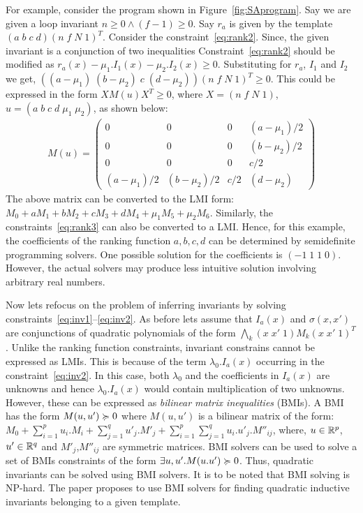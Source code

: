 For example, consider the program shown in Figure~\ref{fig:SAprogram}.
Say we are given a loop invariant $n \ge 0 \wedge (f-1) \ge 0$.
Say $r_a$ is given by the template $(a \; b \; c \; d)(n \; f \; N \; 1)^T$. 
Consider the constraint~\ref{eq:rank2}. Since, the given invariant 
is a conjunction of two inequalities Constraint~\ref{eq:rank2} should be modified as $r_a(x) - \mu_1.I_1(x)- \mu_2.I_2(x) \ge 0$. 
Substituting for $r_a$, $I_1$ and $I_2$ we get,
$((a- \mu_1) \; (b - \mu_2) \; c \; (d-\mu_2))(n \; f \; N \; 1)^T \ge 0$.
This could be expressed in the form $X M(u) X^T \ge 0$, where 
$X=(n \; f \; N \; 1)$, $u = (a \; b \; c \; d \; \mu_1 \; \mu_2)$, 
as shown below:
%
\begin{align*}
M(u) = 
\left( \begin{array}{cccc} 
0 & 0 & 0 & (a- \mu_1)/2 \\
0 & 0 & 0 & (b- \mu_2)/2 \\
0 & 0 & 0 & c/2 \\
(a- \mu_1)/2 & (b- \mu_2)/2 & c/2 & (d-\mu_2) 
\end{array} \right)
\end{align*}
%
The above matrix can be converted to the LMI form: 
$M_0 + a M_1 + b M_2 + c M_3 + d M_4 + \mu_1 M_5 + \mu_2 M_6$.
Similarly, the constraints~\ref{eq:rank3} can also be converted to a LMI.
Hence, for this example, the coefficients of the ranking function $a,b,c,d$
can be determined by semidefinite programming solvers.
One possible solution for the coefficients is $(-1 \; 1 \; 1 \; 0)$. However,
the actual solvers may produce less intuitive solution involving arbitrary real numbers.

Now lets refocus on the problem of inferring invariants by solving constraints~\ref{eq:inv1}--\ref{eq:inv2}. As before lets assume that
$I_a(x)$ and $\sigma(x,x')$ are conjunctions of quadratic polynomials 
of the form $\bigwedge_k (x \; x' \; 1) M_k (x \; x' \; 1)^T$.
Unlike the ranking function constraints, invariant constrains cannot be 
expressed as LMIs. This is because of the term $\lambda_0.I_a(x)$ occurring
in the constraint~\ref{eq:inv2}. In this case, both $\lambda_0$ and the 
coefficients in $I_a(x)$ are unknowns and hence $\lambda_0.I_a(x)$ would contain
multiplication of two unknowns. However, these can be expressed as \emph{bilinear matrix inequalities} (BMIs). A BMI has the form $M(u,u') \succcurlyeq 0$ where $M(u,u')$
is a bilinear matrix of the form: 
$M_0 + \sum \limits_{i=1}^{p} u_i.M_i + \sum \limits_{j=1}^{q} u'_j.M'_j + \sum \limits_{i=1}^{p} \sum \limits_{j=1}^{q} u_i.u'_j.M''_{ij}$,
where, $u \in \mathbb{R}^p$, $u' \in \mathbb{R}^q$ and $M'_j$,$M''_{ij}$ are symmetric matrices. BMI solvers can be used to solve a set of BMIs constraints  of the form $\exists u,u'. M(u.u') \succcurlyeq 0$. Thus, quadratic invariants can be solved using BMI solvers. It is to be noted that BMI solving is NP-hard. The paper proposes
to use BMI solvers for finding quadratic inductive invariants belonging to a given template.


